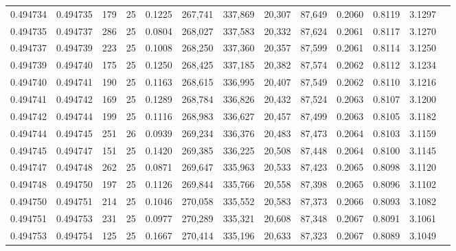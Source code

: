 \begin{tabular}{rrrrrrrrrrrrr}
0.494734 & 0.494735 &   179 &  25 &                                     0.1225 & 267,741 & 337,869 &  20,307 &  87,649 & 0.2060 & 0.8119 & 3.1297 \\
0.494735 & 0.494737 &   286 &  25 &                                     0.0804 & 268,027 & 337,583 &  20,332 &  87,624 & 0.2061 & 0.8117 & 3.1270 \\
0.494737 & 0.494739 &   223 &  25 &                                     0.1008 & 268,250 & 337,360 &  20,357 &  87,599 & 0.2061 & 0.8114 & 3.1250 \\
0.494739 & 0.494740 &   175 &  25 &                                     0.1250 & 268,425 & 337,185 &  20,382 &  87,574 & 0.2062 & 0.8112 & 3.1234 \\
0.494740 & 0.494741 &   190 &  25 &                                     0.1163 & 268,615 & 336,995 &  20,407 &  87,549 & 0.2062 & 0.8110 & 3.1216 \\
0.494741 & 0.494742 &   169 &  25 &                                     0.1289 & 268,784 & 336,826 &  20,432 &  87,524 & 0.2063 & 0.8107 & 3.1200 \\
0.494742 & 0.494744 &   199 &  25 &                                     0.1116 & 268,983 & 336,627 &  20,457 &  87,499 & 0.2063 & 0.8105 & 3.1182 \\
0.494744 & 0.494745 &   251 &  26 &                                     0.0939 & 269,234 & 336,376 &  20,483 &  87,473 & 0.2064 & 0.8103 & 3.1159 \\
0.494745 & 0.494747 &   151 &  25 &                                     0.1420 & 269,385 & 336,225 &  20,508 &  87,448 & 0.2064 & 0.8100 & 3.1145 \\
0.494747 & 0.494748 &   262 &  25 &                                     0.0871 & 269,647 & 335,963 &  20,533 &  87,423 & 0.2065 & 0.8098 & 3.1120 \\
0.494748 & 0.494750 &   197 &  25 &                                     0.1126 & 269,844 & 335,766 &  20,558 &  87,398 & 0.2065 & 0.8096 & 3.1102 \\
0.494750 & 0.494751 &   214 &  25 &                                     0.1046 & 270,058 & 335,552 &  20,583 &  87,373 & 0.2066 & 0.8093 & 3.1082 \\
0.494751 & 0.494753 &   231 &  25 &                                     0.0977 & 270,289 & 335,321 &  20,608 &  87,348 & 0.2067 & 0.8091 & 3.1061 \\
0.494753 & 0.494754 &   125 &  25 &                                     0.1667 & 270,414 & 335,196 &  20,633 &  87,323 & 0.2067 & 0.8089 & 3.1049 \\

\end{tabular}
